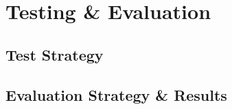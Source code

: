


\chapter{Testing \& Evaluation}\label{testing_evaluation}

\section{Test Strategy}

\section{Evaluation Strategy \& Results}
